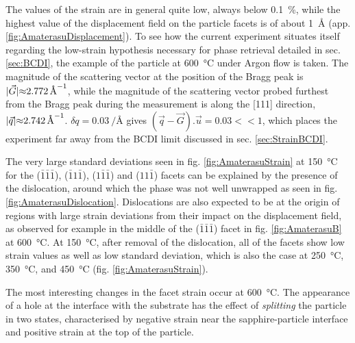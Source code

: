 {The values of the strain are in general quite low, always below \qty{0.1}{\percent}, while the highest value of the displacement field on the particle facets is of about \qty{1}{\angstrom} (app. \ref{fig:AmaterasuDisplacement}).
To see how the current experiment situates itself regarding the low-strain hypothesis necessary for phase retrieval detailed in sec. \ref{sec:BCDI}, the example of the particle at \qty{600}{\degreeCelsius} under Argon flow is taken.
The magnitude of the scattering vector at the position of the Bragg peak is $|\vec{G}| \qty{\approx 2.772}{\per\angstrom}$, while the magnitude of the scattering vector probed furthest from the Bragg peak during the measurement is along the [111] direction, $|\vec{q}| \qty{\approx 2.742}{\per\angstrom}$.
$\delta q = \qty{0.03}{\per\angstrom}$ gives $(\vec{q}-\vec{G}).\vec{u} = 0.03 <<1$, which places the experiment far away from the BCDI limit discussed in sec. \ref{sec:StrainBCDI}.

The very large standard deviations seen in fig. \ref{fig:AmaterasuStrain} at \qty{150}{\degreeCelsius} for the ($\bar{1}\bar{1}\bar{1}$), ($\bar{1}1\bar{1}$), ($1\bar{1}\bar{1}$) and ($11\bar{1}$) facets can be explained by the presence of the dislocation, around which the phase was not well unwrapped as seen in fig. \ref{fig:AmaterasuDislocation}.
Dislocations are also expected to be at the origin of regions with large strain deviations from their impact on the displacement field, as observed for example in the middle of the ($\bar{1}\bar{1}\bar{1}$) facet in fig. \ref{fig:AmaterasuB} at \qty{600}{\degreeCelsius}.
At \qty{150}{\degreeCelsius}, after removal of the dislocation, all of the facets show low strain values as well as low standard deviation, which is also the case at \qty{250}{\degreeCelsius}, \qty{350}{\degreeCelsius}, and \qty{450}{\degreeCelsius} (fig. \ref{fig:AmaterasuStrain}).


The most interesting changes in the facet strain occur at \qty{600}{\degreeCelsius}.
The appearance of a hole at the interface with the substrate has the effect of \textit{splitting} the particle in two states, characterised by negative strain near the sapphire-particle interface and positive strain at the top of the particle.

}
